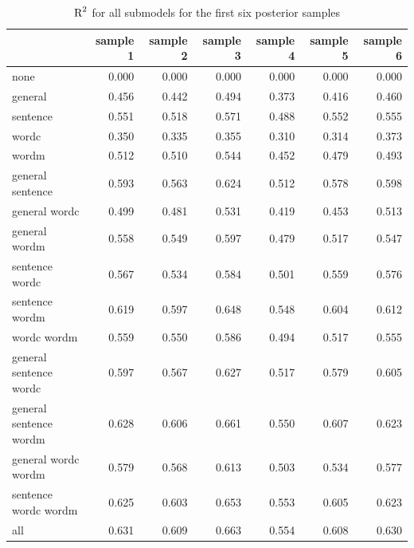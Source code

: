 \documentclass[11pt,a4paper,twoside]{book}
\newenvironment{knitrout}{}{} %
\begin{document}
\begin{knitrout}
\color{fgcolor}\begin{table}

\caption{\label{tab:empirical.data.postsample3}$ \text{R}^2$ for all submodels for the first six posterior samples}
\centering
\begin{tabular}[t]{lrrrrrr}
\toprule
  & sample 1 & sample 2 & sample 3 & sample 4 & sample 5 & sample 6\\
\midrule
none & 0.000 & 0.000 & 0.000 & 0.000 & 0.000 & 0.000\\
general & 0.456 & 0.442 & 0.494 & 0.373 & 0.416 & 0.460\\
sentence & 0.551 & 0.518 & 0.571 & 0.488 & 0.552 & 0.555\\
wordc & 0.350 & 0.335 & 0.355 & 0.310 & 0.314 & 0.373\\
wordm & 0.512 & 0.510 & 0.544 & 0.452 & 0.479 & 0.493\\
general sentence & 0.593 & 0.563 & 0.624 & 0.512 & 0.578 & 0.598\\
general wordc & 0.499 & 0.481 & 0.531 & 0.419 & 0.453 & 0.513\\
general wordm & 0.558 & 0.549 & 0.597 & 0.479 & 0.517 & 0.547\\
sentence wordc & 0.567 & 0.534 & 0.584 & 0.501 & 0.559 & 0.576\\
sentence wordm & 0.619 & 0.597 & 0.648 & 0.548 & 0.604 & 0.612\\
wordc wordm & 0.559 & 0.550 & 0.586 & 0.494 & 0.517 & 0.555\\
general sentence wordc & 0.597 & 0.567 & 0.627 & 0.517 & 0.579 & 0.605\\
general sentence wordm & 0.628 & 0.606 & 0.661 & 0.550 & 0.607 & 0.623\\
general wordc wordm & 0.579 & 0.568 & 0.613 & 0.503 & 0.534 & 0.577\\
sentence wordc wordm & 0.625 & 0.603 & 0.653 & 0.553 & 0.605 & 0.623\\
all & 0.631 & 0.609 & 0.663 & 0.554 & 0.608 & 0.630\\
\bottomrule
\end{tabular}
\end{table}


\end{knitrout}
\end{document}
